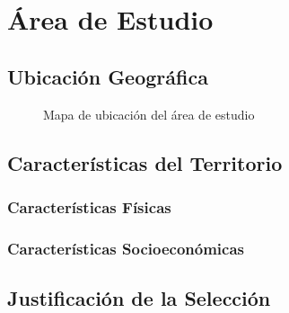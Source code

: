 \documentclass[11pt,letterpaper]{article}
\begin{document}



\section{Área de Estudio}

\subsection{Ubicación Geográfica}


\begin{figure}[H]
    \centering
    \caption{Mapa de ubicación del área de estudio}
    \label{fig:ubicacion}
\end{figure}

\subsection{Características del Territorio}

\subsubsection{Características Físicas}


\subsubsection{Características Socioeconómicas}


\subsection{Justificación de la Selección}


\end{document}
